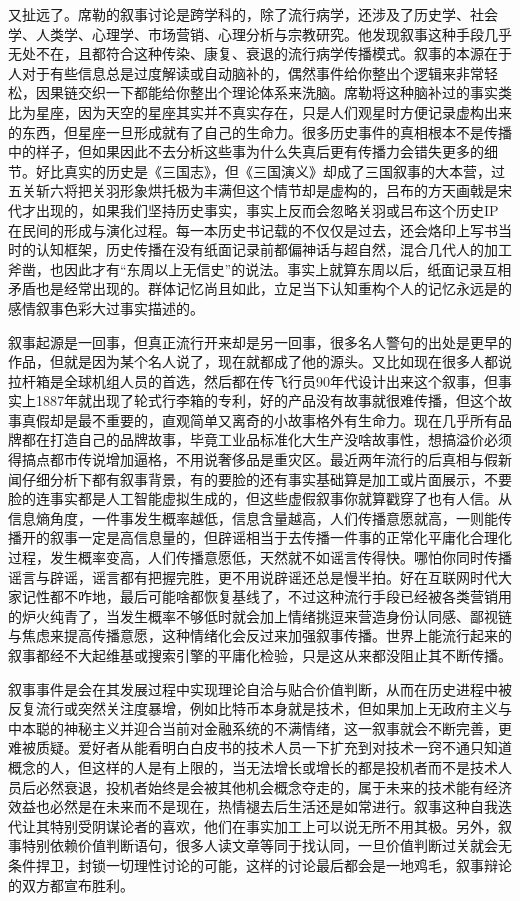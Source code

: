 \documentclass[
]{book}
\begin{document}
又扯远了。席勒的叙事讨论是跨学科的，除了流行病学，还涉及了历史学、社会学、人类学、心理学、市场营销、心理分析与宗教研究。他发现叙事这种手段几乎无处不在，且都符合这种传染、康复、衰退的流行病学传播模式。叙事的本源在于人对于有些信息总是过度解读或自动脑补的，偶然事件给你整出个逻辑来非常轻松，因果链交织一下都能给你整出个理论体系来洗脑。席勒将这种脑补过的事实类比为星座，因为天空的星座其实并不真实存在，只是人们观星时方便记录虚构出来的东西，但星座一旦形成就有了自己的生命力。很多历史事件的真相根本不是传播中的样子，但如果因此不去分析这些事为什么失真后更有传播力会错失更多的细节。好比真实的历史是《三国志》，但《三国演义》却成了三国叙事的大本营，过五关斩六将把关羽形象烘托极为丰满但这个情节却是虚构的，吕布的方天画戟是宋代才出现的，如果我们坚持历史事实，事实上反而会忽略关羽或吕布这个历史IP在民间的形成与演化过程。每一本历史书记载的不仅仅是过去，还会烙印上写书当时的认知框架，历史传播在没有纸面记录前都偏神话与超自然，混合几代人的加工斧凿，也因此才有``东周以上无信史''的说法。事实上就算东周以后，纸面记录互相矛盾也是经常出现的。群体记忆尚且如此，立足当下认知重构个人的记忆永远是的感情叙事色彩大过事实描述的。

叙事起源是一回事，但真正流行开来却是另一回事，很多名人警句的出处是更早的作品，但就是因为某个名人说了，现在就都成了他的源头。又比如现在很多人都说拉杆箱是全球机组人员的首选，然后都在传飞行员90年代设计出来这个叙事，但事实上1887年就出现了轮式行李箱的专利，好的产品没有故事就很难传播，但这个故事真假却是最不重要的，直观简单又离奇的小故事格外有生命力。现在几乎所有品牌都在打造自己的品牌故事，毕竟工业品标准化大生产没啥故事性，想搞溢价必须得搞点都市传说增加逼格，不用说奢侈品是重灾区。最近两年流行的后真相与假新闻仔细分析下都有叙事背景，有的要脸的还有事实基础算是加工或片面展示，不要脸的连事实都是人工智能虚拟生成的，但这些虚假叙事你就算戳穿了也有人信。从信息熵角度，一件事发生概率越低，信息含量越高，人们传播意愿就高，一则能传播开的叙事一定是高信息量的，但辟谣相当于去传播一件事的正常化平庸化合理化过程，发生概率变高，人们传播意愿低，天然就不如谣言传得快。哪怕你同时传播谣言与辟谣，谣言都有把握完胜，更不用说辟谣还总是慢半拍。好在互联网时代大家记性都不咋地，最后可能啥都恢复基线了，不过这种流行手段已经被各类营销用的炉火纯青了，当发生概率不够低时就会加上情绪挑逗来营造身份认同感、鄙视链与焦虑来提高传播意愿，这种情绪化会反过来加强叙事传播。世界上能流行起来的叙事都经不大起维基或搜索引擎的平庸化检验，只是这从来都没阻止其不断传播。

叙事事件是会在其发展过程中实现理论自洽与贴合价值判断，从而在历史进程中被反复流行或突然关注度暴增，例如比特币本身就是技术，但如果加上无政府主义与中本聪的神秘主义并迎合当前对金融系统的不满情绪，这一叙事就会不断完善，更难被质疑。爱好者从能看明白白皮书的技术人员一下扩充到对技术一窍不通只知道概念的人，但这样的人是有上限的，当无法增长或增长的都是投机者而不是技术人员后必然衰退，投机者始终是会被其他机会概念夺走的，属于未来的技术能有经济效益也必然是在未来而不是现在，热情褪去后生活还是如常进行。叙事这种自我迭代让其特别受阴谋论者的喜欢，他们在事实加工上可以说无所不用其极。另外，叙事特别依赖价值判断语句，很多人读文章等同于找认同，一旦价值判断过关就会无条件捍卫，封锁一切理性讨论的可能，这样的讨论最后都会是一地鸡毛，叙事辩论的双方都宣布胜利。
\end{document}
